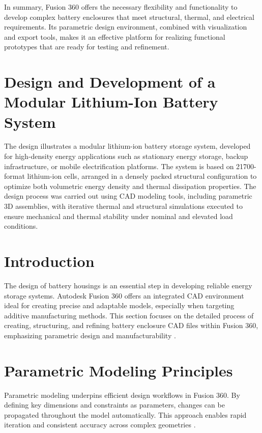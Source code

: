 In summary, Fusion 360 offers the necessary flexibility and functionality to develop complex battery enclosures that meet structural, thermal, and electrical requirements. Its parametric design environment, combined with visualization and export tools, makes it an effective platform for realizing functional prototypes that are ready for testing and refinement.

\section{Design and Development of a Modular Lithium-Ion Battery System}

The design illustrates a modular lithium-ion battery storage system, developed for high-density energy applications such as stationary energy storage, backup infrastructure, or mobile electrification platforms. The system is based on 21700-format lithium-ion cells, arranged in a densely packed structural configuration to optimize both volumetric energy density and thermal dissipation properties. The design process was carried out using CAD modeling tools, including parametric 3D assemblies, with iterative thermal and structural simulations executed to ensure mechanical and thermal stability under nominal and elevated load conditions.

\section{Introduction}

The design of battery housings is an essential step in developing reliable energy storage systems. Autodesk Fusion 360 offers an integrated CAD environment ideal for creating precise and adaptable models, especially when targeting additive manufacturing methods. This section focuses on the detailed process of creating, structuring, and refining battery enclosure CAD files within Fusion 360, emphasizing parametric design and manufacturability \cite{hogan2025}.

\section{Parametric Modeling Principles}

Parametric modeling underpins efficient design workflows in Fusion 360. By defining key dimensions and constraints as parameters, changes can be propagated throughout the model automatically. This approach enables rapid iteration and consistent accuracy across complex geometries \cite{anderson2020}.

